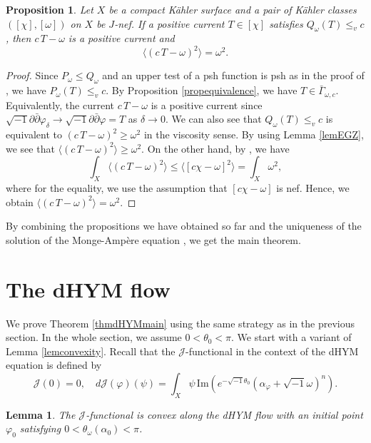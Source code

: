 \documentclass{amsart}
\numberwithin{equation}{section}
\theoremstyle{plain}
\newtheorem{prop}[equation]{Proposition}
\newtheorem{lem}[equation]{Lemma}
\theoremstyle{definition}
\theoremstyle{remark}
\newcommand{\delb}{\sqrt{-1}\partial\bar{\partial}}
\begin{document}
\begin{prop}
    Let $X$ be a compact K{\"a}hler surface and a pair of K{\"a}hler classes $([\chi],[\omega])$ on $X$ be $J$-nef. If a positive current $T \in [\chi]$ satisfies $Q_\omega(T)\le_v c$, then $c\, T-\omega$ is a positive current and
    $$\langle (c\, T-\omega)^2\rangle=\omega^2.$$
\end{prop}

\begin{proof}
    Since $P_\omega \le Q_\omega$ and an upper test of a psh function is psh as in the proof of \cite[Proposition 1.3]{EGZ}, we have $P_\omega(T)\le_v c$. By Proposition \ref{propequivalence}, we have $T \in \bar{\Gamma}_{\omega,c}$. Equivalently, the current $c\, T-\omega$ is a positive current since $\delb\varphi_\delta \rightarrow \delb\varphi=T$ as $\delta \rightarrow 0$. 
    We can also see that $Q_\omega(T) \le_v c$ is equivalent to $(c\, T-\omega)^2 \ge \omega^2$ in the viscosity sense. 
    By using Lemma \ref{lemEGZ}, we see that $\langle(c \, T-\omega)^2 \rangle \ge \omega^2$. 
    On the other hand, by \cite[Proposition 1.20]{BEGZ}, we have
    $$\int_X \langle(c\, T-\omega)^2\rangle \le \langle[c\chi-\omega]^2\rangle = \int_X\omega^2,$$ 
    where for the equality, we use the assumption that $[c\chi-\omega]$ is nef. Hence, we obtain $\langle(c \, T-\omega)^2\rangle =\omega^2$.
\end{proof}

By combining the propositions we have obtained so far and the uniqueness of the solution of the Monge-Amp{\`e}re equation \cite[Theorem A]{BEGZ}, we get the main theorem.


\section{The dHYM flow}\label{secdHYM}
We prove Theorem \ref{thmdHYMmain} using the same strategy as in the previous section. In the whole section, we assume $0<\theta_0<\pi$. We start with a variant of Lemma \ref{lemconvexity}. Recall that the $\mathcal{J}$-functional in the context of the dHYM equation is defined by
\begin{equation*}
    \mathcal{J}(0)=0, \quad d\mathcal{J}(\varphi)(\psi)=\int_X\psi \, \mathrm{Im}\left(e^{-\sqrt{-1}\theta_0}(\alpha_\varphi+\sqrt{-1}\omega)^n\right).
\end{equation*}

\begin{lem}\label{lemdhymconvexity}
    The $\mathcal{J}$-functional is convex along the dHYM flow with an initial point $\varphi_0$ satisfying $0<\theta_\omega(\alpha_0)<\pi$.
\end{lem}
\end{document}

